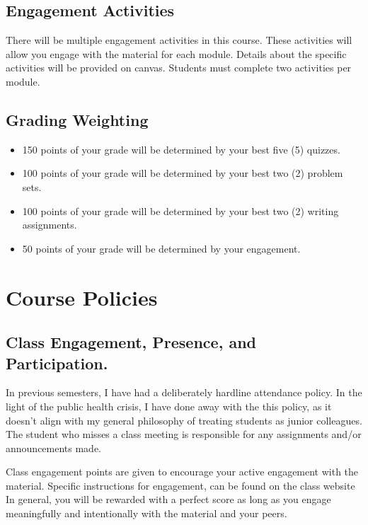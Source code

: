 \documentclass[11pt,]{article}
\providecommand{\tightlist}{%
  \setlength{\itemsep}{0pt}\setlength{\parskip}{0pt}}
\begin{document}
\hypertarget{engagement-activities}{%
\subsection{Engagement Activities}\label{engagement-activities}}

There will be multiple engagement activities in this course. These
activities will allow you engage with the material for each module.
Details about the specific activities will be provided on canvas.
Students must complete two activities per module.

\hypertarget{grading-weighting}{%
\subsection{Grading Weighting}\label{grading-weighting}}

\begin{itemize}
\tightlist
\item
  150 points of your grade will be determined by your best five (5)
  quizzes.
\item
  100 points of your grade will be determined by your best two (2)
  problem sets.
\item
  100 points of your grade will be determined by your best two (2)
  writing assignments.
\item
  50 points of your grade will be determined by your engagement.
\end{itemize}

\hypertarget{course-policies}{%
\section{Course Policies}\label{course-policies}}

\hypertarget{class-engagement-presence-and-participation.}{%
\subsection{Class Engagement, Presence, and
Participation.}\label{class-engagement-presence-and-participation.}}

In previous semesters, I have had a deliberately hardline attendance
policy. In the light of the public health crisis, I have done away with
the this policy, as it doesn't align with my general philosophy of
treating students as junior colleagues. The student who misses a class
meeting is responsible for any assignments and/or announcements made.

Class engagement points are given to encourage your active engagement
with the material. Specific instructions for engagement, can be found on
the class website In general, you will be rewarded with a perfect score
as long as you engage meaningfully and intentionally with the material
and your peers.
\end{document}
